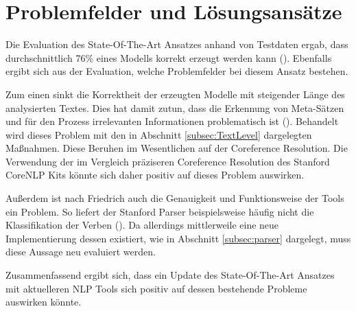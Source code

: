 \section{Problemfelder und Lösungsansätze}
\label{SUBSEC:PROBLEMFELDER}
Die Evaluation des State-Of-The-Art Ansatzes anhand von Testdaten ergab, dass durchschnittlich 76\% eines Modells korrekt erzeugt werden kann (\cite[vgl.][115]{FRIEDRICH1}). Ebenfalls ergibt sich aus der Evaluation, welche Problemfelder bei diesem Ansatz bestehen.\par Zum einen sinkt die Korrektheit der erzeugten Modelle mit steigender Länge des analysierten Textes. Dies hat damit zutun, dass die Erkennung von Meta-Sätzen und für den Prozess irrelevanten Informationen problematisch ist (\cite[vgl.][116]{FRIEDRICH1}). Behandelt wird dieses Problem mit den in Abschnitt \ref{subsec:TextLevel} dargelegten Maßnahmen. Diese Beruhen im Wesentlichen auf der Coreference Resolution. Die Verwendung der im Vergleich präziseren Coreference Resolution des Stanford CoreNLP Kits könnte sich daher positiv auf dieses Problem auswirken.\par
Außerdem ist nach Friedrich auch die Genauigkeit und Funktionsweise der Tools ein Problem. So liefert der Stanford Parser beispielsweise häufig nicht die Klassifikation der Verben (\cite[vgl.][117 ff.]{FRIEDRICH1}). Da allerdings mittlerweile eine neue Implementierung dessen existiert, wie in Abschnitt \ref{subsec:parser} dargelegt, muss diese Aussage neu evaluiert werden.\par
Zusammenfassend ergibt sich, dass ein Update des State-Of-The-Art Ansatzes mit aktuelleren \ac{NLP} Tools sich positiv auf dessen bestehende Probleme auswirken könnte.


